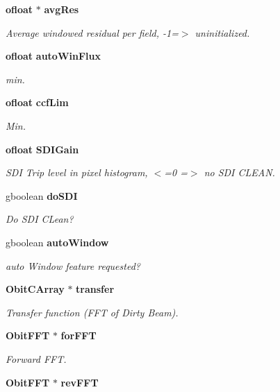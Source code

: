 \begin{CompactItemize}
{\bf ofloat} $\ast$ {\bf avg\-Res}
\begin{CompactList}\small\item\em Average windowed residual per field, -1=$>$ uninitialized. \item\end{CompactList}\item 
{\bf ofloat} {\bf auto\-Win\-Flux}
\begin{CompactList}\small\item\em min. \item\end{CompactList}\item 
{\bf ofloat} {\bf ccf\-Lim}
\begin{CompactList}\small\item\em Min. \item\end{CompactList}\item 
{\bf ofloat} {\bf SDIGain}
\begin{CompactList}\small\item\em SDI Trip level in pixel histogram, $<$=0 =$>$ no SDI CLEAN. \item\end{CompactList}\item 
gboolean {\bf do\-SDI}
\begin{CompactList}\small\item\em Do SDI CLean? \item\end{CompactList}\item 
gboolean {\bf auto\-Window}
\begin{CompactList}\small\item\em auto Window feature requested? \item\end{CompactList}\item 
{\bf Obit\-CArray} $\ast$ {\bf transfer}
\begin{CompactList}\small\item\em Transfer function (FFT of Dirty Beam). \item\end{CompactList}\item 
{\bf Obit\-FFT} $\ast$ {\bf for\-FFT}
\begin{CompactList}\small\item\em Forward FFT. \item\end{CompactList}\item 
{\bf Obit\-FFT} $\ast$ {\bf rev\-FFT}

\end{CompactItemize}
